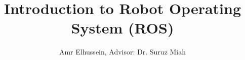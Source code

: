 \documentclass[
12pt,draftcls,onecolumn%
]{IEEEtran}
\begin{document}
%
\title{Introduction to Robot Operating System (ROS)}

\author{Amr Elhussein, Advisor: Dr. Suruz Miah %



}

\maketitle

%
%
\end{document}
